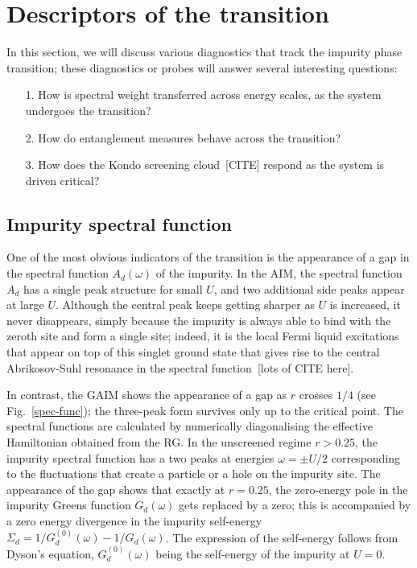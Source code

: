 \documentclass[reprint,superscriptaddress,floatfix]{revtex4-2}
\begin{document}
\section{Descriptors of the transition}

In this section, we will discuss various diagnostics that track the impurity phase transition; these diagnostics or probes will answer several interesting questions:
\begin{itemize}
	\item[1.] How is spectral weight transferred across energy scales, as the system undergoes the transition?
	\item[2.] How do entanglement measures behave across the transition?
	\item[3.] How does the Kondo screening cloud~\cite{}[CITE] respond as the system is driven critical?
\end{itemize}

\subsection{Impurity spectral function}

One of the most obvious indicators of the transition is the appearance of a gap in the spectral function \(A_d(\omega)\) of the impurity. In the AIM, the spectral function \(A_d\) has a single peak structure for small \(U\), and two additional side peaks appear at large \(U\). Although the central peak keeps getting sharper as \(U\) is increased, it never disappears, simply because the impurity is always able to bind with the zeroth site and form a single site; indeed, it is the local Fermi liquid excitations that appear on top of this singlet ground state that gives rise to the central Abrikosov-Suhl resonance in the spectral function~\cite{}[lots of CITE here].

In contrast, the GAIM shows the appearance of a gap as \(r\) crosses \(1/4\) (see Fig.~\ref{spec-func}); the three-peak form survives only up to the critical point. The spectral functions are calculated by numerically diagonalising the effective Hamiltonian obtained from the RG. In the unscreened regime \(r > 0.25\), the impurity spectral function has a two peaks at energies \(\omega = \pm U/2\) corresponding to the fluctuations that create a particle or a hole on the impurity site. The appearance of the gap shows that exactly at \(r=0.25\), the zero-energy pole in the impurity Greens function \(G_d(\omega)\) gets replaced by a zero; this is accompanied by a zero energy divergence in the impurity self-energy \(\Sigma_d = 1/G_d^{(0)}(\omega) - 1/G_d(\omega)\). The expression of the self-energy follows from Dyson's equation, \(G_d^{(0)}(\omega)\) being the self-energy of the impurity at \(U=0\).
\end{document}
